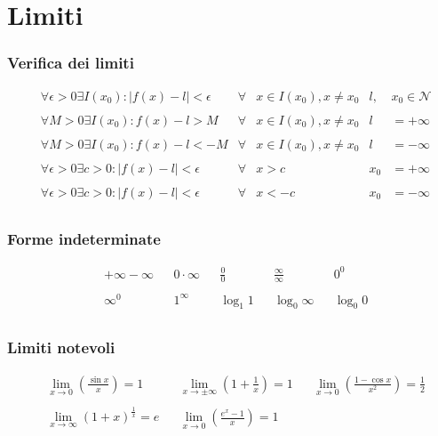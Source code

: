 \documentclass[a4paper]{article}
\begin{document}
	\newpage
	\section{Limiti}
	
	\subsubsection{Verifica dei limiti}
	\begin{align*}
		&\forall \epsilon > 0 \exists I(x_0) : \left| f(x) - l \right|<\epsilon	&	\forall &x \in I(x_0),x\ne x_0	&	l,&x_0 \in \mathcal{N}\\\\
		&\forall M > 0 \exists I(x_0) : f(x) - l > M	&	\forall &x \in I(x_0),x\ne x_0	&	l &=+\infty\\\\
		&\forall M > 0 \exists I(x_0) : f(x) - l < -M	&	\forall &x \in I(x_0),x\ne x_0	&	l &=-\infty\\\\
		&\forall \epsilon > 0 \exists c>0: \left| f(x) - l \right| < \epsilon	&	\forall &x>c	&	x_0 &= +\infty\\\\
		&\forall \epsilon > 0 \exists c>0: \left| f(x) - l \right| < \epsilon	&	\forall &x<-c	&	x_0 &= -\infty\\
	\end{align*}
	\subsubsection{Forme indeterminate}
	\begin{align*}
		 & +\infty-\infty &  & 0\cdot \infty &  & \frac{0}{0} &  & \frac{\infty}{\infty} &  & 0^0        \\\\
		 & \infty^0       &  & 1^\infty      &  & \log_{1}1   &  & \log_{0} \infty       &  & \log_{0} 0\\
	\end{align*}
	
	\subsubsection{Limiti notevoli}
	\begin{align*}
		 & \lim\limits_{x \to 0} \left(\frac{\sin x}{x}\right) = 1 &  & \lim\limits_{x \to \pm \infty} \left(1+\frac{1}{x}\right) = 1	&	&\lim\limits_{x \to 0} \left(\frac{1-\cos x}{x^2}\right) = \frac{1}{2}\\\\
		 & \lim\limits_{x \to \infty} (1+x)^{\frac{1}{x}} = e &  & \lim\limits_{x \to 0} \left(\frac{e^x-1}{x}\right) = 1\\
		 \end{align*}
	
\end{document}
